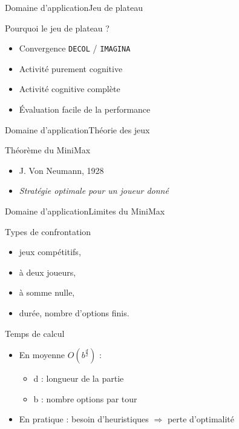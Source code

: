 \begin{frame}{Domaine d'application}{Jeu de plateau}

\begin{block}{Pourquoi le jeu de plateau ?}
\begin{itemize}
\item Convergence \texttt{DECOL} / \texttt{IMAGINA}
\pause
\item Activité purement cognitive
\pause
\item Activité cognitive complète
\pause
\item Évaluation facile de la performance
\end{itemize}
\end{block}

\end{frame}


\begin{frame}{Domaine d'application}{Théorie des jeux}

\begin{block}{Théorème du MiniMax}
\begin{itemize}
\item J. Von Neumann, 1928
\item \textit{Stratégie optimale pour un joueur donné}
\end{itemize}
\end{block}
\end{frame}



\begin{frame}{Domaine d'application}{Limites du MiniMax}

\begin{block}{Types de confrontation}
\begin{itemize}
\item jeux compétitifs,
\item à deux joueurs,
\item à somme nulle,
\item durée, nombre d'options finis.
\end{itemize}
\end{block}

\pause

\begin{block}{Temps de calcul}
\begin{itemize}
\item En moyenne \emph{$O(b^{\frac{d}{2}})$} :
	\begin{itemize}
	\item d : longueur de la partie
	\item b : nombre options par tour
	\end{itemize}
\item En pratique : besoin d'heuristiques $\Rightarrow$ perte d'optimalité
\end{itemize}
\end{block}

\end{frame}
